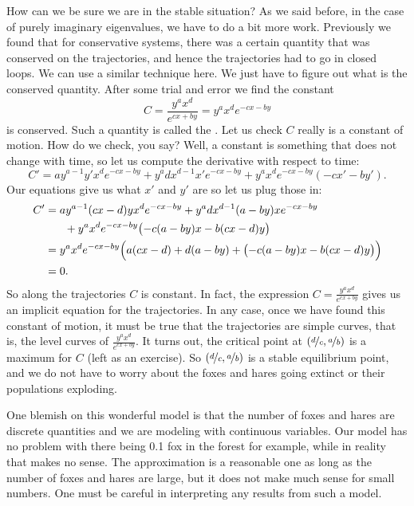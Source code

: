 How can we be sure we are in the stable situation?
As we said before, in the case of purely imaginary eigenvalues, we have to
do a bit more work.  Previously we found that for conservative systems,
there was a certain quantity that was conserved on the trajectories, and
hence the trajectories had to go in closed loops.
We can use a similar technique here.  We just have to figure out what is the
conserved quantity.  After some trial and error we find the
constant
\begin{equation*}
C = \frac{y^a x^d}{e^{cx+by}} = y^a x^d e^{-cx-by}
\end{equation*}
is conserved.  Such a quantity is called the \emph{}.  Let us check $C$ really is a constant of motion.  How do we check, you say?  Well, a constant is
something that does not change with time, so let us compute the derivative
with respect to time:
\begin{equation*}
C' = 
a y^{a-1}y' x^d e^{-cx-by}
+
y^a d x^{d-1} x' e^{-cx-by}
+
y^a x^d e^{-cx-by} (-cx'-by') .
\end{equation*}
Our equations give us what $x'$ and $y'$ are so let us plug those in:
\begin{equation*}
\begin{split}
C' & = 
a y^{a-1} (cx-d)y x^d e^{-cx-by}
+
y^a d x^{d-1} (a-by)x e^{-cx-by}
\\
& \phantom{mm} +
y^a x^d e^{-cx-by} \bigl(-c(a-by)x-b(cx-d)y\bigr)
\\
& =
y^a x^d e^{-cx-by}
\Bigl(
a (cx-d)
+
d (a-by)
+
\bigl(-c(a-by)x-b(cx-d)y\bigr) \Bigr)
\\
& = 
0 .
\end{split}
\end{equation*}
So along the trajectories $C$ is constant.  In fact, the expression $C =
\frac{y^a x^d}{e^{cx+by}}$ gives us an implicit equation for the
trajectories.  In any case, once we have found this constant of motion,
it must be true that the
trajectories are simple curves, that is, the level curves of
$\frac{y^a x^d}{e^{cx+by}}$.  It turns out, the critical point at
$(\nicefrac{d}{c},\nicefrac{a}{b})$ is a maximum for $C$ (left as an exercise).
So $(\nicefrac{d}{c},\nicefrac{a}{b})$ is a stable equilibrium point, and 
we do not have to worry about the foxes and hares going extinct or their
populations exploding.

One blemish on this wonderful model is that the number of foxes and hares
are discrete quantities and we are modeling with continuous variables.  Our
model has no problem with there being 0.1 fox in the forest for example,
while in reality that makes no sense.  The approximation is a reasonable one
as long as the number of foxes and hares are large, but it does not make
much sense for small numbers.  One must be careful in interpreting any
results from such a model.

